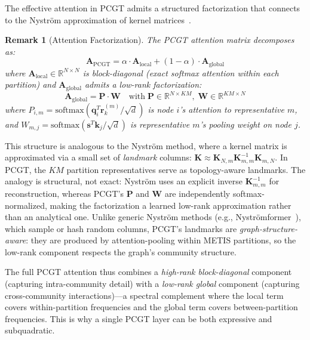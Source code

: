 \documentclass[sigconf]{acmart}
\newtheorem{remark}{Remark}
\begin{document}
The effective attention in PCGT admits a structured factorization that connects to the Nystr\"om approximation of kernel matrices~\citep{xiong2021nystromformer}.

\begin{remark}[Attention Factorization]
The PCGT attention matrix decomposes as:
\begin{equation}
\mathbf{A}_{\mathrm{PCGT}} = \alpha \cdot \mathbf{A}_{\mathrm{local}} + (1-\alpha) \cdot \mathbf{A}_{\mathrm{global}}
\label{eq:factorization}
\end{equation}
where $\mathbf{A}_{\mathrm{local}} \in \mathbb{R}^{N \times N}$ is \emph{block-diagonal} (exact softmax attention within each partition) and $\mathbf{A}_{\mathrm{global}}$ admits a \emph{low-rank factorization}:
\begin{equation}
\mathbf{A}_{\mathrm{global}} = \mathbf{P} \cdot \mathbf{W} \quad \text{with}\; \mathbf{P} \in \mathbb{R}^{N \times KM},\; \mathbf{W} \in \mathbb{R}^{KM \times N}
\label{eq:lowrank}
\end{equation}
where $P_{i,m} = \mathrm{softmax}(\mathbf{q}_i^T \mathbf{r}_k^{(m)} / \sqrt{d})$ is node $i$'s attention to representative $m$, and $W_{m,j} = \mathrm{softmax}(\mathbf{s}^T \mathbf{k}_j / \sqrt{d})$ is representative $m$'s pooling weight on node $j$.
\end{remark}

This structure is analogous to the Nystr\"om method, where a kernel matrix is approximated via a small set of \emph{landmark} columns: $\mathbf{K} \approx \mathbf{K}_{N,m} \mathbf{K}_{m,m}^{-1} \mathbf{K}_{m,N}$. In PCGT, the $KM$ partition representatives serve as topology-aware landmarks. The analogy is structural, not exact: Nystr\"om uses an explicit inverse $\mathbf{K}_{m,m}^{-1}$ for reconstruction, whereas PCGT's $\mathbf{P}$ and $\mathbf{W}$ are independently softmax-normalized, making the factorization a learned low-rank approximation rather than an analytical one.  Unlike generic Nystr\"om methods (e.g., Nystr\"omformer~\citep{xiong2021nystromformer}), which sample or hash random columns, PCGT's landmarks are \emph{graph-structure-aware}: they are produced by attention-pooling within METIS partitions, so the low-rank component respects the graph's community structure.

The full PCGT attention thus combines a \emph{high-rank block-diagonal} component (capturing intra-community detail) with a \emph{low-rank global} component (capturing cross-community interactions)---a spectral complement where the local term covers within-partition frequencies and the global term covers between-partition frequencies. This is why a single PCGT layer can be both expressive and subquadratic.
\end{document}
